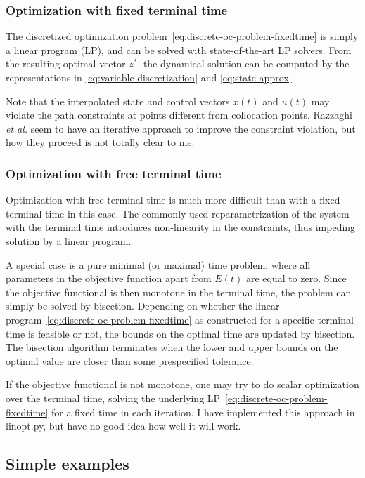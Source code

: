\documentclass[a4paper,11pt,DIV12]{scrartcl}
\theoremstyle{remark}
\begin{document}
\subsubsection{Optimization with fixed terminal time}
\label{sec:optim-with-fixed}

The discretized optimization problem~\eqref{eq:discrete-oc-problem-fixedtime} is simply a linear program (LP), and can be solved with state-of-the-art LP solvers.
From the resulting optimal vector $z^\ast$, the dynamical solution can be computed by the representations in \eqref{eq:variable-discretization} and \eqref{eq:state-approx}.

Note that the interpolated state and control vectors $x(t)$ and $u(t)$ may violate the path constraints at points different from collocation points.
Razzaghi \textit{et al.} \cite{RazzaghiNaz1998} seem to have an iterative approach to improve the constraint violation, but how they proceed is not totally clear to me.

\subsubsection{Optimization with free terminal time}
\label{sec:optim-with-free}

Optimization with free terminal time is much more difficult than with a fixed terminal time in this case.
The commonly used reparametrization of the system with the terminal time introduces non-linearity in the constraints, thus impeding solution by a linear program.

A special case is a pure minimal (or maximal) time problem, where all parameters in the objective function apart from $E(t)$ are equal to zero.
Since the objective functional is then monotone in the terminal time, the problem can simply be solved by bisection.
Depending on whether the linear program~\eqref{eq:discrete-oc-problem-fixedtime} as constructed for a specific terminal time is feasible or not, the bounds on the optimal time are updated by bisection.
The bisection algorithm terminates when the lower and upper bounds on the optimal value are closer than some prespecified tolerance.

If the objective functional is not monotone, one may try to do scalar optimization over the terminal time, solving the underlying LP~\eqref{eq:discrete-oc-problem-fixedtime} for a fixed time in each iteration.
I have implemented this approach in linopt.py, but have no good idea how well it will work.

\subsection{Simple examples}
\label{sec:simple-examples}
\end{document}
